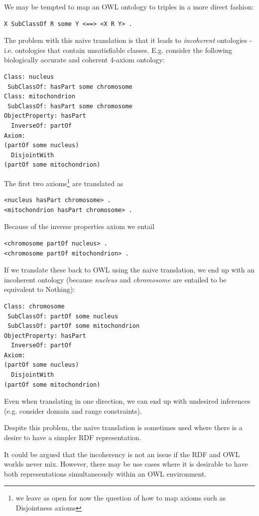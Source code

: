 \documentclass{my}
\begin{document}
We may be tempted to map an OWL ontology to triples in a more direct
fashion:

\begin{verbatim}
X SubClassOf R some Y <==> <X R Y> .
\end{verbatim}

The problem with this naive translation is that it leads to
\emph{incoherent} ontologies - i.e. ontologies that contain
unsatisfiable classes. E.g. consider the following biologically
accurate and coherent 4-axiom ontology:

\begin{verbatim}
Class: nucleus
 SubClassOf: hasPart some chromosome
Class: mitochondrion 
 SubClassOf: hasPart some chromosome
ObjectProperty: hasPart
  InverseOf: partOf
Axiom:
(partOf some nucleus) 
  DisjointWith 
(partOf some mitochondrion)
\end{verbatim}

The first two axioms\footnote{we leave as open for now the question of
  how to map axioms such as Disjointness axioms} are translated as

\begin{verbatim}
<nucleus hasPart chromosome> .
<mitochondrion hasPart chromosome> .
\end{verbatim}

Because of the inverse properties axiom we entail

\begin{verbatim}
<chromosome partOf nucleus> .
<chromosome partOf mitochondrion> .
\end{verbatim}

If we translate these back to OWL using the naive translation, we end
up with an incoherent ontology (because \emph{nucleus} and
\emph{chromosome} are entailed to be equivalent to Nothing):

\begin{verbatim}
Class: chromosome
 SubClassOf: partOf some nucleus
 SubClassOf: partOf some mitochondrion
ObjectProperty: hasPart
  InverseOf: partOf
Axiom:
(partOf some nucleus) 
  DisjointWith 
(partOf some mitochondrion)
\end{verbatim}

Even when translating in one direction, we can end up with undesired
inferences (e.g. consider domain and range constraints).

Despite this problem, the naive translation is sometimes used where
there is a desire to have a simpler RDF representation.

It could be argued that the incoherency is not an issue if the RDF and
OWL worlds never mix. However, there may be use cases where it is
desirable to have both representations simultaneously within an OWL
environment.
\end{document}
